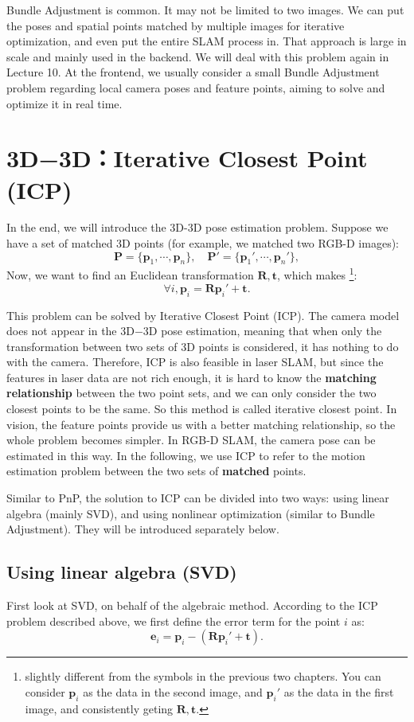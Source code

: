 Bundle Adjustment is common. It may not be limited to two images. We can put the poses and spatial points matched by multiple images for iterative optimization, and even put the entire SLAM process in. That approach is large in scale and mainly used in the backend. We will deal with this problem again in Lecture 10. At the frontend, we usually consider a small Bundle Adjustment problem regarding local camera poses and feature points, aiming to solve and optimize it in real time.

\section{3D−3D：Iterative Closest Point (ICP)}
In the end, we will introduce the 3D-3D pose estimation problem. Suppose we have a set of matched 3D points (for example, we matched two RGB-D images):
\[
\mathbf{P} = \{ \mathbf{p}_1, \cdots, \mathbf{p}_n \}, \quad \mathbf{P}' = \{ \mathbf{p}_1', \cdots, \mathbf{p}_n'\},
\]
Now, we want to find an Euclidean transformation $\mathbf{R}, \mathbf{t}$, which makes \footnote{slightly different from the symbols in the previous two chapters. You can consider $\mathbf{p}_i$ as the data in the second image, and $\mathbf{p}_i'$ as the data in the first image, and consistently geting $ \mathbf{R},\mathbf{t}$.}:
\[
\forall i, \mathbf{p}_i = \mathbf{R} \mathbf{p}_i' + \mathbf{t}.
\]

This problem can be solved by Iterative Closest Point (ICP). The camera model does not appear in the 3D−3D pose estimation, meaning that when only the transformation between two sets of 3D points is considered, it has nothing to do with the camera. Therefore, ICP is also feasible in laser SLAM, but since the features in laser data are not rich enough, it is hard to know the \textbf{matching relationship} between the two point sets, and we can only consider the two closest points to be the same. So this method is called iterative closest point. In vision, the feature points provide us with a better matching relationship, so the whole problem becomes simpler. In RGB-D SLAM, the camera pose can be estimated in this way. In the following, we use ICP to refer to the motion estimation problem between the two sets of \textbf{matched} points.

Similar to PnP, the solution to ICP can be divided into two ways: using linear algebra (mainly SVD), and using nonlinear optimization (similar to Bundle Adjustment). They will be introduced separately below.

\subsection{Using linear algebra (SVD)}
First look at SVD, on behalf of the algebraic method. According to the ICP problem described above, we first define the error term for the point $i$ as:
\begin{equation}
\mathbf{e}_i = \mathbf{p}_i - (\mathbf{R} \mathbf{p}_i' + \mathbf{t} ) .
\end{equation}

